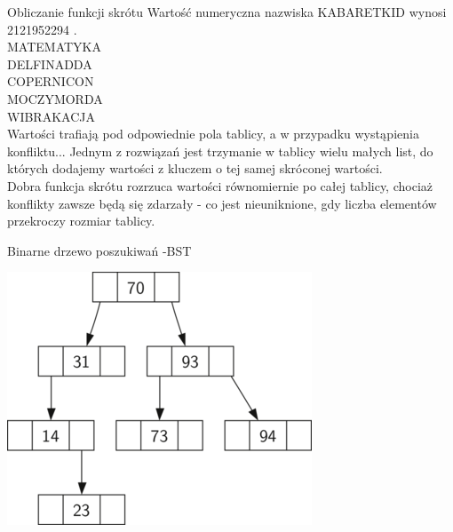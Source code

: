 \begin{frame}{Obliczanie funkcji skrótu}
    Wartość numeryczna nazwiska KABARETKID wynosi 2121952294   . \\
    MATEMATYKA     \\
    DELFINADDA    \\
    COPERNICON     \\
    MOCZYMORDA    \\
    WIBRAKACJA    \\
    Wartości trafiają pod odpowiednie pola tablicy, a w przypadku wystąpienia konfliktu...
    Jednym z rozwiązań jest trzymanie w tablicy wielu małych list, do których dodajemy wartości
    z kluczem o tej samej skróconej wartości. \\
    Dobra funkcja skrótu rozrzuca wartości równomiernie po całej tablicy, chociaż konflikty zawsze
    będą się zdarzały - co jest nieuniknione, gdy liczba elementów przekroczy rozmiar tablicy.
\end{frame}
\begin{frame}{Binarne drzewo poszukiwań -BST}
    \begin{center}
        \includegraphics[height=0.8\textheight]{data_structures/graphics/bst.png}
    \end{center}
\end{frame}
